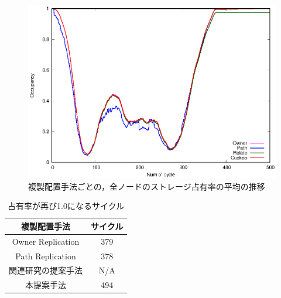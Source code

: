 \documentclass[11pt]{jreport}
\begin{document}
\begin{figure}[H]
	\begin{center}
		\includegraphics[width=15.0cm]{./figure/occupancy_comp.eps}
	\end{center}
	\caption{複製配置手法ごとの，全ノードのストレージ占有率の平均の推移}
	\label{fig:occupancy_comp}
\end{figure}

\begin{table}[H]
	\begin{center}
	\caption{占有率が再び1.0になるサイクル}
	\begin{tabular}{ | c | c | } \hline
	複製配置手法 & サイクル \\ \hline \hline
	Owner Replication &  379 \\ \hline
    Path Replication & 378  \\ \hline
    関連研究の提案手法 & N/A  \\ \hline
    本提案手法 & 494  \\ \hline
	\end{tabular}
	\label{tab:occupancy}
	\end{center}
\end{table}
\end{document}
